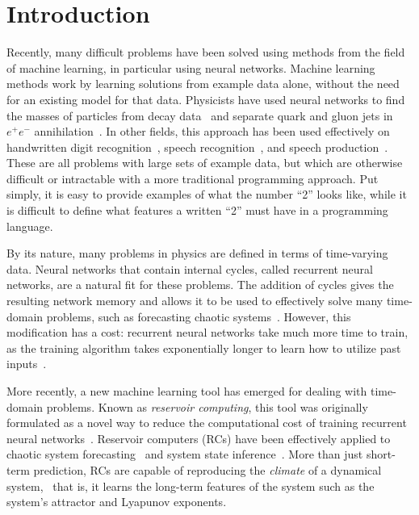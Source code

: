 \chapter{Introduction}\label{ch:introduction}


Recently, many difficult problems have been solved using methods from
the field of machine learning, in particular using neural
networks. Machine learning methods work by learning solutions from
example data alone, without the need for an existing model for that
data.  Physicists have used neural networks to find the masses of
particles from decay data~\cite{lonnblad1992} and separate quark and
gluon jets in $e^+ e^-$ annihilation~\cite{csabai1991}.  In other
fields, this approach has been used effectively on handwritten digit
recognition~\cite{lecun1998,simard2003}, speech
recognition~\cite{hinton2012}, and speech production~\cite{oord2016}.
These are all problems with large sets of example data, but which are
otherwise difficult or intractable with a more traditional programming
approach. Put simply, it is easy to provide examples of what the
number ``\num{2}'' looks like, while it is difficult to define what
features a written ``\num{2}'' must have in a programming language.

By its nature, many problems in physics are defined in terms of
time-varying data. Neural networks that contain internal cycles,
called recurrent neural networks, are a natural fit for these
problems. The addition of cycles gives the resulting network memory
and allows it to be used to effectively solve many time-domain
problems, such as forecasting chaotic
systems~\cite{garcia-pedrero2010}. However, this modification has a
cost: recurrent neural networks take much more time to train, as the
training algorithm takes exponentially longer to learn how to utilize
past inputs~\cite{bengio1994,lukosevicius2009}.

More recently, a new machine learning tool has emerged for dealing
with time-domain problems.  Known as \emph{reservoir computing}, this
tool was originally formulated as a novel way to reduce the
computational cost of training recurrent neural
networks~\cite{lukosevicius2009}. Reservoir computers (RCs) have been
effectively applied to chaotic system
forecasting~\cite{jaeger1978,pathak2017} and system state
inference~\cite{lu2017}. More than just short-term prediction, RCs are
capable of reproducing the \emph{climate} of a dynamical
system,~\cite{pathak2017,haluszczynski2019} that is, it learns the long-term
features of the system such as the system's attractor and Lyapunov
exponents.

